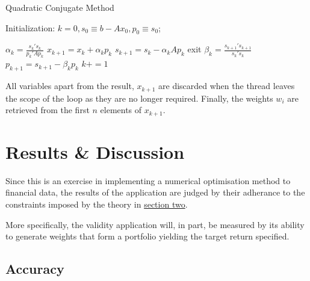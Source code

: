 \documentclass{article}
\begin{document}
\newpage 


\begin{algorithm}
	\caption{Quadratic Conjugate Method} 
	
	Initialization: $k=0, s_0 \equiv b - Ax_0, p_0 \equiv s_0$;
	
	\begin{algorithmic}[1]
		\State $\alpha_k = \frac{s_{k}'s_{k}}{p_{k}'Ap_{k}}$
		\State $x_{k+1} = x_{k} + 	\alpha_kp_{k}$
		\State $s_{k+1} = s_{k} - 	\alpha_kAp_{k}$
		\State exit
		\EndIf
		\State $\beta_k = \frac{s_{k+1}'s_{k+1}}{s_{k}'s_{k}}$
		\State $p_{k+1} = s_{k+1} - 	\beta_kp_{k}$
		\State $k+=1$
		\EndWhile
	\end{algorithmic} 
\end{algorithm}


All variables apart from the result, $x_{k+1}$ are discarded when the thread leaves the scope of the loop as they are no longer required. Finally, the weights $w_{i}$ are retrieved from the first $n$ elements of $x_{k+1}$. 













\section{Results \& Discussion}
\label{sec:results}

Since this is an exercise in implementing a numerical optimisation method to financial data, the results of the application are judged by their adherance to the constraints imposed by the theory in \hyperref[theory]{section two}.

More specifically, the validity application will, in part, be measured by its ability to generate weights that form a portfolio yielding the target return specified.



\subsection{Accuracy}
\end{document}
